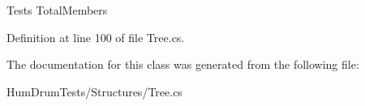 Tests Total\+Members 



Definition at line 100 of file Tree.\+cs.



The documentation for this class was generated from the following file\+:\begin{DoxyCompactItemize}
\item 
Hum\+Drum\+Tests/\+Structures/Tree.\+cs\end{DoxyCompactItemize}

